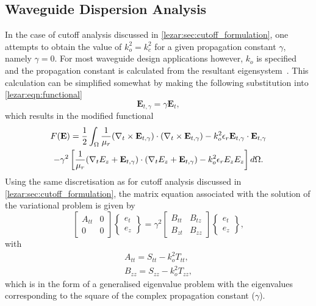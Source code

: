 \subsection{Waveguide Dispersion Analysis}
\label{lezar:sec:propagation_curves}
In the case of cutoff analysis discussed in
\ref{lezar:sec:cutoff_formulation}, one attempts to obtain the value of
$k_o^2 = k_c^2$ for a given propagation constant $\gamma$,
namely $\gamma = 0$.  For most waveguide design applications however,
$k_o$ is specified and the propagation constant is calculated
from the resultant eigensystem~\cite{Jin2002, PelCoc1998}.  This
calculation can be simplified somewhat by making the following
substitution into \eqref{lezar:eqn:functional}
\begin{equation}
    \mathbf{E}_{t,\gamma} = \gamma\mathbf{E}_t,
\end{equation}
which results in the modified functional
\begin{multline}
    \label{lezar:eqn:functional_scaled}
    F(\mathbf{E}) =
    \frac{1}{2}\int_{\Omega}\frac{1}{\mu_r}(\curl{\mathbf{E}_{t,\gamma}}{t})\cdot(\curl{\mathbf{E}_{t,\gamma}}{t}) -k_o^2\epsilon_r\mathbf{E}_{t,\gamma}\cdot{\mathbf{E}_{t,\gamma}}\\
    -\gamma^2\left[\frac{1}{\mu_r}(\nabla_t{E_z} +
    \mathbf{E}_{t,\gamma})\cdot(\nabla_t{E_z} + \mathbf{E}_{t,\gamma})-k_o^2\epsilon_r
    E_z{E_z}\right] d\Omega.
\end{multline}
Using the same discretisation as for cutoff analysis discussed in \ref{lezar:sec:cutoff_formulation}, the matrix equation associated with the solution of the variational problem is given by
\begin{equation}
    \label{lezar:eqn:matrix_equation_dispersion}
    \begin{bmatrix} A_{tt} & 0\\0 & 0\end{bmatrix}\begin{Bmatrix}e_t\\e_z\end{Bmatrix} =
    \gamma^2\begin{bmatrix} B_{tt} & B_{tz}\\B_{zt} &
    B_{zz}\end{bmatrix}\begin{Bmatrix}e_t\\e_z\end{Bmatrix},
\end{equation}
with
\begin{align}
    A_{tt} = S_{tt} - k_o^2 T_{tt},\\
    B_{zz} = S_{zz} - k_o^2 T_{zz},
\end{align}
which is in the form of a generalised eigenvalue
problem with the eigenvalues corresponding
to the square of the complex propagation constant ($\gamma$).

